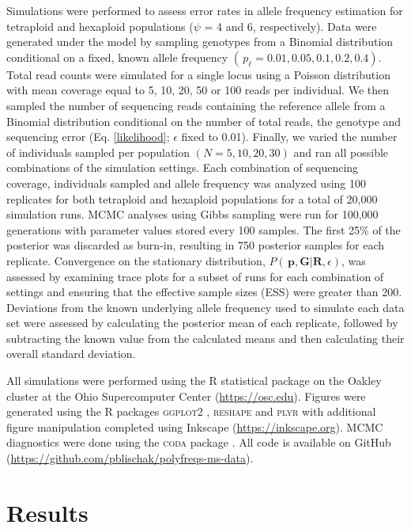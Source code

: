 \documentclass[11pt,english,letterpaper,oneside]{article}
\begin{document}
Simulations were performed to assess error rates in allele frequency estimation for tetraploid and hexaploid populations ($\psi$ = 4 and 6, respectively). Data were generated under the model by sampling genotypes from a Binomial distribution conditional on a fixed, known allele frequency $(\,p_{\ell} = 0.01, 0.05, 0.1, 0.2, 0.4)$. Total read counts were simulated for a single locus using a Poisson distribution with mean coverage equal to 5, 10, 20, 50 or 100 reads per individual. We then sampled the number of sequencing reads containing the reference allele from a Binomial distribution conditional on the number of total reads, the genotype and sequencing error (Eq. \ref{likelihood}; $\epsilon$ fixed to 0.01). Finally, we varied the number of individuals sampled per population $(N = 5, 10, 20, 30)$ and ran all possible combinations of the simulation settings. Each combination of sequencing coverage, individuals sampled and allele frequency was analyzed using 100 replicates for both tetraploid and hexaploid populations for a total of  20,000 simulation runs. MCMC analyses using Gibbs sampling were run for 100,000 generations with parameter values stored every 100 samples. The first 25\% of the posterior was discarded as burn-in, resulting in 750 posterior samples for each replicate. Convergence on the stationary distribution, $P(\,\bm{p},\bm{G}|\bm{R},\epsilon)$, was assessed by examining trace plots for a subset of runs for each combination of settings and ensuring that the effective sample sizes (ESS) were greater than 200. Deviations from the known underlying allele frequency used to simulate each data set were assessed by calculating the posterior mean of each replicate, followed by subtracting the known value from the calculated means and then calculating their overall standard deviation.
\medskip

All simulations were performed using the R statistical package \citep{r2014} on the Oakley cluster at the Ohio Supercomputer Center (\url{https://osc.edu}). Figures were generated using the R packages \textsc{ggplot2} \citep{wickham2009ggplot2}, \textsc{reshape} \citep{wickham2011plyr} and \textsc{plyr} \citep{wickham2007reshape} with additional figure manipulation completed using Inkscape (\url{https://inkscape.org}). MCMC diagnostics were done using the \textsc{coda} package \citep{plummer2006coda}. All code is available on GitHub (\url{https://github.com/pblischak/polyfreqs-ms-data}).
\medskip

\section*{Results}         %
\end{document}

